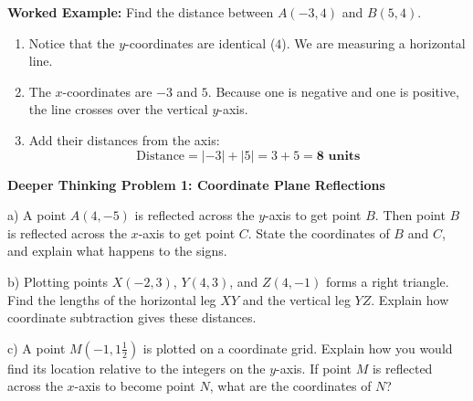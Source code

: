 \documentclass[12pt, letterpaper, fleqn]{article}
\begin{document}
\vspace{0.8cm}
\begin{tcolorbox}[colback=white, colframe=black!25, boxrule=0.6pt, arc=4mm, left=6mm, right=6mm, top=4mm, bottom=4mm]

\vspace{0.3cm}
\textbf{Worked Example:} Find the distance between $A(-3, 4)$ and $B(5, 4)$.
\begin{enumerate}[itemsep=2pt]
    \item Notice that the $y$-coordinates are identical ($4$). We are measuring a horizontal line.
    \item The $x$-coordinates are $-3$ and $5$. Because one is negative and one is positive, the line crosses over the vertical $y$-axis.
    \item Add their distances from the axis: 
    $$\text{Distance} = |-3| + |5| = 3 + 5 = \mathbf{8 \text{ units}}$$
\end{enumerate}

\end{tcolorbox}
\vspace{4mm}

\begin{tcolorbox}[colback=white, colframe=black, boxrule=1pt, arc=4mm, left=6mm, right=6mm, top=5mm, bottom=5mm]
\textbf{Deeper Thinking Problem 1: Coordinate Plane Reflections}

\medskip

\noindent
a) A point $A(4, -5)$ is reflected across the $y$-axis to get point $B$. Then point $B$ is reflected across the $x$-axis to get point $C$. State the coordinates of $B$ and $C$, and explain what happens to the signs.

\vspace{5cm}

\noindent
b) Plotting points $X(-2, 3)$, $Y(4, 3)$, and $Z(4, -1)$ forms a right triangle. Find the lengths of the horizontal leg $XY$ and the vertical leg $YZ$. Explain how coordinate subtraction gives these distances.

\vspace{5cm}

\noindent
c) A point $M\left(-1, 1\frac{1}{2}\right)$ is plotted on a coordinate grid. Explain how you would find its location relative to the integers on the $y$-axis. If point $M$ is reflected across the $x$-axis to become point $N$, what are the coordinates of $N$?

\vspace{5cm}

\end{tcolorbox}
\newpage
\end{document}
